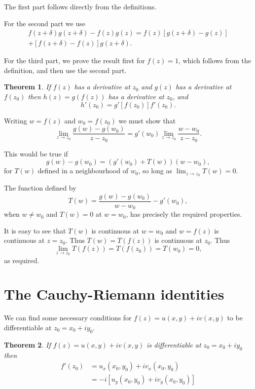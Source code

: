 \documentclass[a4paper,10pt]{article}
\newtheorem{theorem}{Theorem}[section]
\begin{document}
The first part follows directly from the definitions.

For the second part we use
\begin{multline*}
f(z + \delta)g(z + \delta) - f(z)g(z) = f(z)\left[g(z + \delta) - g(z)\right] \\
         + \left[f(z + \delta) - f(z)\right]g(z + \delta).
\end{multline*}

For the third part, we prove the result first for $f(z) = 1$, which follows from the definition, and then use the second part.

\begin{theorem}
If $f(z)$ has a derivative at $z_0$ and $g(z)$ has a derivative at $f(z_0)$ then $h(z) = g(f(z))$ has a derivative at $z_0$, and
$$h'(z_0) = g'\left[f(z_0)\right]f'(z_0).$$
\end{theorem}

Writing $w = f(z)$ and $w_0 = f(z_0)$ we must show that
$$\lim_{z\to z_0}\frac{g(w) - g(w_0)}{z - z_0} = g'(w_0)\lim_{z\to z_0}\frac{w - w_0}{z - z_0}.$$

This would be true if
$$g(w) - g(w_0) = (g'(w_0) + T(w))(w - w_0),$$
for $T(w)$ defined in a neighbourhood of $w_0$, so long as $\lim_{z\to z_0}T(w) = 0$.

The function defined by
$$T(w) = \frac{g(w) - g(w_0)}{w - w_0} - g'(w_0),$$
when $w \neq w_0$ and $T(w) = 0$ at $w = w_0$, has precisely the required properties.

It is easy to see that $T(w)$ is continuous at $w = w_0$ and $w = f(z)$ is continuous at $z = z_0$. Thus $T(w) = T(f(z))$ is continuous at $z_0$. Thus
$$\lim_{z\to z_0}T(f(z)) = T(f(z_0)) = T(w_0) = 0,$$
as required.

\section{The Cauchy-Riemann identities}

We can find some necessary conditions for $f(z) = u(x, y) + iv(x, y)$ to be differentiable at $z_0 = x_0 + iy_0$.

\begin{theorem}
If $f(z) = u(x, y) + iv(x, y)$ is differentiable at $z_0 = x_0 + iy_0$ then
\begin{equation}
\begin{split}
f'(z_0) & = u_x(x_0, y_0) + iv_x(x_0, y_0) \\
        & = -i\left[u_y(x_0, y_0) + iv_y(x_0, y_0)\right]
\end{split}
\end{equation}
\end{theorem}
\end{document}
